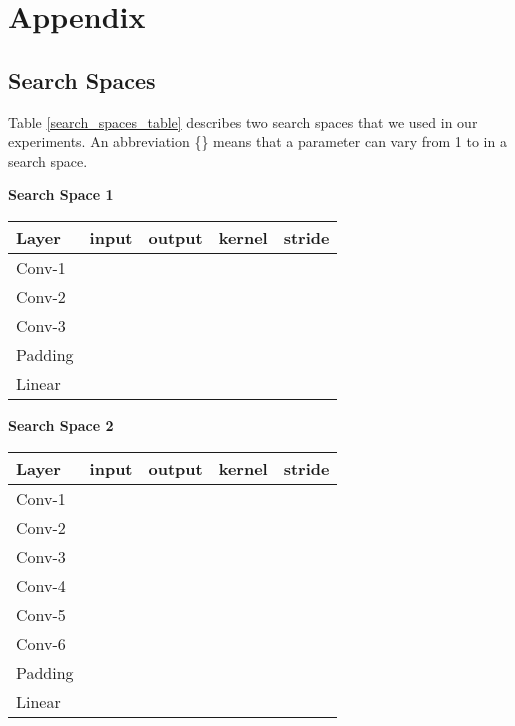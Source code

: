 \documentclass{svproc}
\begin{document}
\section{Appendix}
\begin{appendix}
\section{Search Spaces}
\label{app:search-spaces}
Table \ref{search_spaces_table} describes two search spaces that we used in our experiments. An abbreviation \{\} means that a parameter can vary from 1 to  in a search space.
\begin{table*}[!h]
\begin{multicols}{2}
    \begin{center}
    \textbf{Search Space 1}
    \begin{tabularx}{0.5\textwidth} {@{}lcccc@{}}
        \hline
        \textbf{Layer} & \textbf{input} & \textbf{output} & \textbf{kernel} & \textbf{stride}\\
        \hline
        Conv-1 &  &  &  &          \\
        Conv-2 &  &  &  &  \\
        Conv-3 &  &  &  &  \\
        Padding &  &  &  &     \\        
        Linear &  &  &  &    \\
        \hline

    \end{tabularx}
    \end{center}

    \vfill\eject
    
    \begin{center}
    \textbf{Search Space 2}
    \begin{tabularx}{0.5\textwidth}{@{}lcccc@{}}
        \hline
        \textbf{Layer} & \textbf{input} & \textbf{output} & \textbf{kernel} & \textbf{stride}\\
        \hline
        Conv-1 &  &  &  &          \\
        Conv-2 &  &  &  &      \\
        Conv-3 &  &  &  &      \\
        Conv-4 &  &  &  &      \\
        Conv-5 &  &  &  &      \\
        Conv-6 &  &  &  &      \\
        Padding &  &  &  &     \\        
        Linear &  &  &  &    \\
        \hline
    

\end{tabularx}
\end{center}
\end{multicols}
\end{table*}
\end{appendix}
\end{document}
